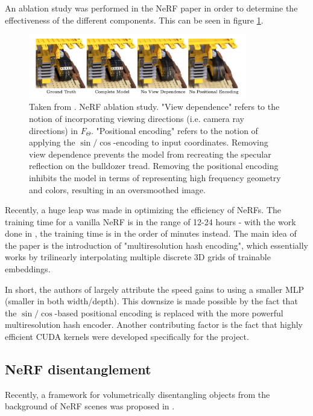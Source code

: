 An ablation study was performed in the NeRF paper in order to determine the effectiveness of the different components. This can be seen in figure \ref{fig:nerf-ablation}.
\begin{figure}[H]
    \centering
    \includegraphics[width=0.85\textwidth]{figures/nerf-ablation.png}
    \caption{Taken from \cite{nerf2020}. NeRF ablation study. "View dependence" refers to the notion of incorporating viewing directions (i.e. camera ray directions) in $F_\Theta$. "Positional encoding" refers to the notion of applying the $\sin/\cos$-encoding to input coordinates. Removing view dependence prevents the model from recreating the specular reflection on the bulldozer tread. Removing the positional encoding inhibits the model in terms of representing high frequency geometry and colors, resulting in an oversmoothed image.}
    \label{fig:nerf-ablation}
\end{figure}


Recently, a huge leap was made in optimizing the efficiency of NeRFs. The training time for a vanilla NeRF is in the range of 12-24 hours - with the work done in \cite{mueller2022}, the training time is in the order of minutes instead. The main idea of the paper is the introduction of "multiresolution hash encoding", which essentially works by trilinearly interpolating multiple discrete 3D grids of trainable embeddings.

In short, the authors of \cite{mueller2022} largely attribute the speed gains to using a smaller MLP (smaller in both width/depth). This downsize is made possible by the fact that the $\sin/\cos$-based positional encoding is replaced with the more powerful multiresolution hash encoder. Another contributing factor is the fact that highly efficient CUDA kernels were developed specifically for the project.

\subsection{NeRF disentanglement}
Recently, a framework for volumetrically disentangling objects from the background of NeRF scenes was proposed in \cite{benaim2022}. 

